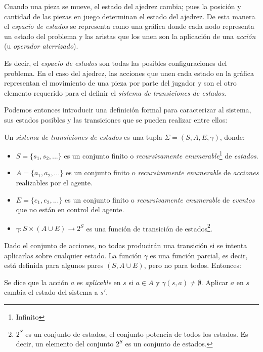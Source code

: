 Cuando una pieza se mueve, el estado del ajedrez cambia; pues la posición y cantidad de las piezas en juego determinan el estado del ajedrez.  De esta manera el \emph{espacio de estados} se representa como una gráfica donde cada nodo representa un estado del problema y las aristas que los unen son la aplicación de una \emph{acción} (u \textit{operador aterrizado}).\par


Es decir, el \emph{espacio de estados} son todas las posibles configuraciones del problema. En el caso del ajedrez, las acciones que unen cada estado en la gráfica representan el movimiento de una pieza por parte del jugador y son el otro elemento requerido para el definir el \emph{sistema de transiciones de estados}.

Podemos entonces introducir una definición formal para caracterizar al sistema, sus estados posibles y las transiciones que se pueden realizar entre ellos:


\begin{definition}
 Un \emph{sistema de transiciones de estados} es una tupla $\Sigma=(S,A,E, \gamma)$, donde:
 \begin{itemize}
  \item $S= \{s_1,s_2,...\}$ es un conjunto finito o \textit{recursivamente enumerable}\footnote{Infinito} de \emph{estados}.
  \item $A= \{a_1,a_2,...\}$ es un conjunto finito o \textit{recursivamente enumerable} de \emph{acciones} realizables por el agente.
  \item $E= \{e_1,e_2,...\}$ es un conjunto finito o \textit{recursivamente enumerable} de \emph{eventos} que no están en control del agente.
  \item $\gamma: S \times (A \cup E) \rightarrow 2^S$ es una función de transición de estados\footnote{$2^S$ es un conjunto de estados, el conjunto potencia de todos los estados.  Es decir, un elemento del conjunto $2^S$ es un conjunto de estados.}.
 \end{itemize}
 \parencite{Ghallab2004}
\end{definition}

Dado el conjunto de acciones, no todas producirán una transición si se intenta aplicarlas sobre cualquier estado.  La función $\gamma$ es una función parcial, es decir, está definida para algunos pares $(S, A \cup E)$, pero no para todos.  Entonces:

\begin{definition}
  Se dice que la acción $a$ es \emph{aplicable} en $s$ si $a \in A$ y $\gamma(s,a) \neq \emptyset$.  Aplicar $a$ en $s$ cambia el estado del sistema a $s'$. \parencite{Ghallab2004}
\end{definition}

